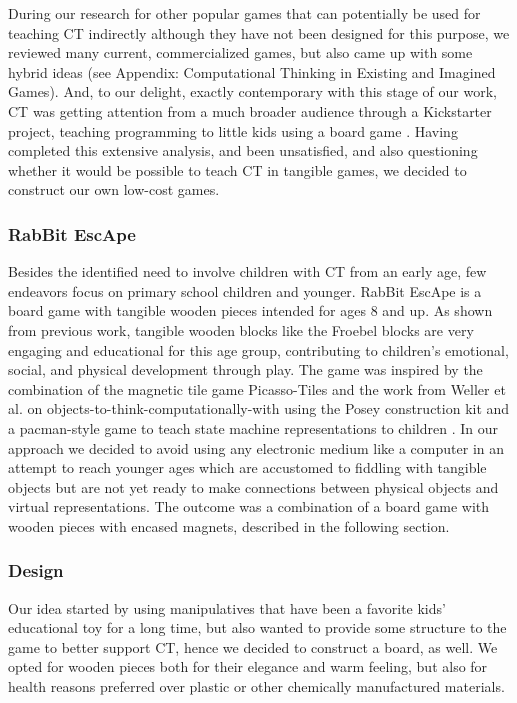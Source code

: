 \documentclass{acm_proc_article-sp}
\begin{document}
During our research for other popular games that can potentially be used for teaching CT indirectly although they have not been designed for this purpose, we reviewed many current, commercialized games, but also came up with some hybrid ideas (see Appendix: Computational Thinking in Existing and Imagined Games). And, to our delight, exactly contemporary with this stage of our work, CT was getting attention from a much broader audience through a Kickstarter project, teaching programming to little kids using a board game \cite{robotturtles}. Having completed this extensive analysis, and been unsatisfied, and also questioning whether it would be possible to teach CT in tangible games, we decided to construct our own low-cost games.

\subsubsection{RabBit EscApe}
Besides the identified need to involve children with CT from an early age, few endeavors focus on primary school children and younger. RabBit EscApe is a board game with tangible wooden pieces intended for ages 8 and up. As shown from previous work, tangible wooden blocks like the Froebel blocks\cite{liebschner1992child} are very engaging and educational for this age group, contributing to children’s emotional, social, and physical development through play. The game was inspired by the combination of the magnetic tile game Picasso-Tiles\cite{picassotiles3d} and the work from Weller et al. on objects-to-think-computationally-with using the Posey construction kit and a pacman-style game to teach state machine representations to children \cite{weller2008escape}. In our approach we decided to avoid using any electronic medium like a computer in an attempt to reach younger ages which are accustomed to fiddling with tangible objects but are not yet ready to make connections between physical objects and virtual representations. The outcome was a combination of a board game with wooden pieces with encased magnets, described in the following section.

\subsubsection{Design}
Our idea started by using manipulatives that have been a favorite kids’ educational toy for a long time, but also wanted to provide some structure to the game to better support CT, hence we decided to construct a board, as well. We opted for wooden pieces both for their elegance and warm feeling, but also for health reasons preferred over plastic or other chemically manufactured materials. 
\end{document}
